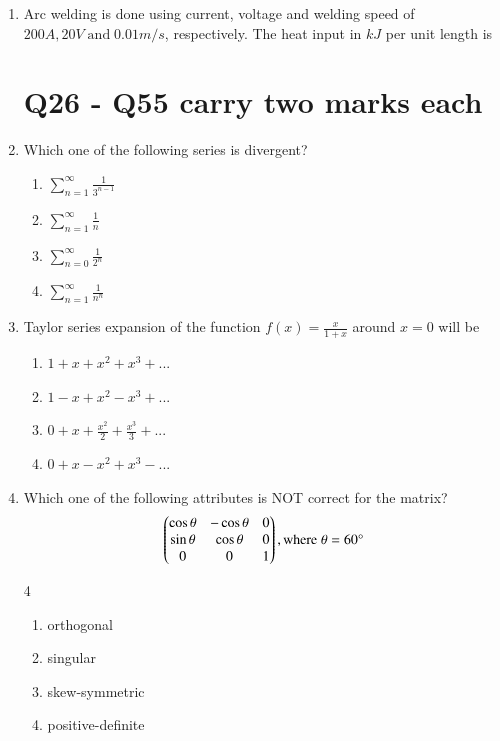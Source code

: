 \documentclass[journal]{IEEEtran}
\theoremstyle{remark}
\begin{document}
\begin{enumerate}
\item  Arc welding is done using current, voltage and welding speed of $200 A, 20 V \;\text{and}\; 0.01 m/s$, respectively. The heat input in $kJ$ per unit length is \underline {\hspace{2cm}} \hfill{}

\section{Q26 - Q55 carry two marks each}

\item  Which one of the following series is divergent?\hfill{}
\begin{multicols}{4}
\begin{enumerate}
\item $\sum_{n=1}^\infty \frac{1}{3^{n-1}}$
\item $\sum_{n=1}^\infty \frac{1}{n}$
\item $\sum_{n=0}^\infty \frac{1}{2^{n}}$
\item $\sum_{n=1}^\infty \frac{1}{n^{n}}$
\end{enumerate}
\end{multicols}

\item Taylor series expansion of the function $f(x)=\frac{x}{1+x}$ around $x=0$ will be
\hfill{}
\begin{multicols}{4}
\begin{enumerate}
\item $1+x+x^2+x^3+...$
\item $1-x+x^2-x^3+...$
\item $0+x+\frac{x^2}{2}+\frac{x^3}{3}+...$
\item $0+x-x^2+x^3-...$
\end{enumerate}
\end{multicols}

\item  Which one of the following attributes is NOT correct for the matrix? 
 \hfill{}\\
 \begin{align}
\begin{pmatrix}\cos{\theta}& -\cos{\theta} & 0\\ \sin{\theta}& \cos{\theta}& 0\\ 0& 0 & 1
 \end{pmatrix} , \text{where}\; \theta=60\degree
  \end{align}

\begin {multicols}{4}
\begin{enumerate}
\item orthogonal
\item  singular 
\item skew-symmetric 
\item positive-definite 
\end{enumerate}
\end{multicols}


\end{enumerate}
\end{document}
